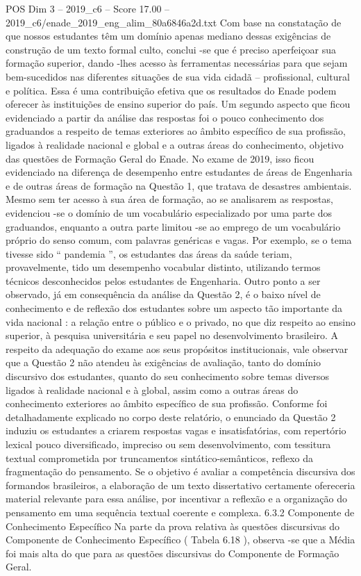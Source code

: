 \begin{textsample}{POS Dim 3 – 2019\_c6 – Score 17.00 – 2019\_c6/enade\_2019\_eng\_alim\_80a6846a2d.txt}
Com base na constatação de que nossos estudantes têm um domínio apenas mediano dessas exigências de construção de um texto formal culto, conclui -se que é preciso aperfeiçoar sua formação superior, dando -lhes acesso às ferramentas necessárias para que sejam bem-sucedidos nas diferentes situações de sua vida cidadã – profissional, cultural e política.
Essa é uma contribuição efetiva que os resultados do Enade podem oferecer às instituições de ensino superior do país.
Um segundo aspecto que ficou evidenciado a partir da análise das respostas foi o pouco conhecimento dos graduandos a respeito de temas exteriores ao âmbito específico de sua profissão, ligados à realidade nacional e global e a outras áreas do conhecimento, objetivo das questões de Formação Geral do Enade.
No exame de 2019, isso ficou evidenciado na diferença de desempenho entre estudantes de áreas de Engenharia e de outras áreas de formação na Questão 1, que tratava de desastres ambientais.
Mesmo sem ter acesso à sua área de formação, ao se analisarem as respostas, evidenciou -se o domínio de um vocabulário especializado por uma parte dos graduandos, enquanto a outra parte limitou -se ao emprego de um vocabulário próprio do senso comum, com palavras genéricas e vagas.
Por exemplo, se o tema tivesse sido “ pandemia ”, os estudantes das áreas da saúde teriam, provavelmente, tido um desempenho vocabular distinto, utilizando termos técnicos desconhecidos pelos estudantes de Engenharia.
Outro ponto a ser observado, já em consequência da análise da Questão 2, é o baixo nível de conhecimento e de reflexão dos estudantes sobre um aspecto tão importante da vida nacional : a relação entre o público e o privado, no que diz respeito ao ensino superior, à pesquisa universitária e seu papel no desenvolvimento brasileiro.
A respeito da adequação do exame aos seus propósitos institucionais, vale observar que a Questão 2 não atendeu às exigências de avaliação, tanto do domínio discursivo dos estudantes, quanto do seu conhecimento sobre temas diversos ligados à realidade nacional e à global, assim como a outras áreas do conhecimento exteriores ao âmbito específico de sua profissão.
Conforme foi detalhadamente explicado no corpo deste relatório, o enunciado da Questão 2 induziu os estudantes a criarem respostas vagas e insatisfatórias, com repertório lexical pouco diversificado, impreciso ou sem desenvolvimento, com tessitura textual comprometida por truncamentos sintático-semânticos, reflexo da fragmentação do pensamento.
Se o objetivo é avaliar a competência discursiva dos formandos brasileiros, a elaboração de um texto dissertativo certamente ofereceria material relevante para essa análise, por incentivar a reflexão e a organização do pensamento em uma sequência textual coerente e complexa. 6.3.2 Componente de Conhecimento Específico Na parte da prova relativa às questões discursivas do Componente de Conhecimento Específico ( Tabela 6.18 ), observa -se que a Média foi mais alta do que para as questões discursivas do Componente de Formação Geral.

\end{textsample}
